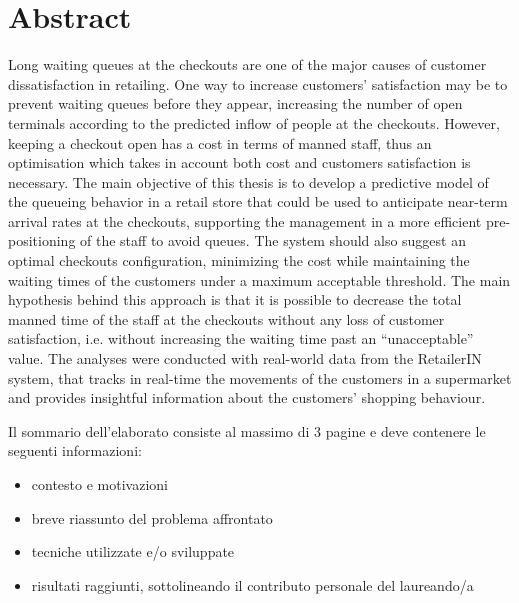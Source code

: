 \chapter*{Abstract}
\label{abstract}


Long waiting queues at the checkouts are one of the major causes of customer dissatisfaction in retailing. One way to increase customers' satisfaction may be to prevent waiting queues before they appear, increasing the number of open terminals according to the predicted inflow of people at the checkouts. However, keeping a checkout open has a cost in terms of manned staff, thus an optimisation which takes in account both cost and customers satisfaction is necessary.
The main objective of this thesis is to develop a predictive model of the queueing behavior in a retail store that could be used to anticipate near-term arrival rates at the checkouts, supporting the management in a more efficient pre-positioning of the staff to avoid queues. The system should also suggest an optimal checkouts configuration, minimizing the cost while maintaining the waiting times of the customers under a maximum acceptable threshold. The main hypothesis behind this approach is that it is possible to decrease the total manned time of the staff at the checkouts without any loss of customer satisfaction, i.e. without increasing the waiting time past an “unacceptable” value.
The analyses were conducted with real-world data from the RetailerIN system, that tracks in real-time the movements of the customers in a supermarket and provides insightful information about the customers’ shopping behaviour.

Il sommario dell’elaborato consiste al massimo di 3 pagine e deve contenere le seguenti informazioni:
\begin{itemize}
  \item contesto e motivazioni
  \item breve riassunto del problema affrontato
  \item tecniche utilizzate e/o sviluppate
  \item risultati raggiunti, sottolineando il contributo personale del laureando/a
\end{itemize}

\clearpage



